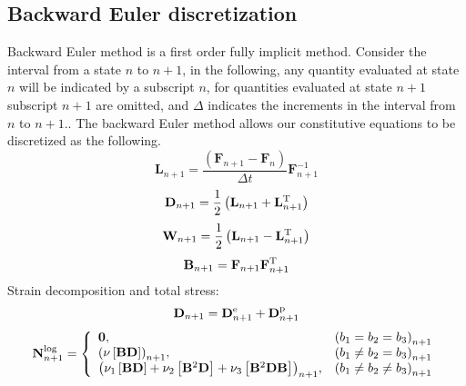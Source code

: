 \subsection{Backward Euler discretization}
\noindent
Backward Euler method is a first order fully implicit method. Consider the interval from a state $n$ to $n+1$, in the following, any quantity evaluated at state $n$ will be indicated by a subscript $n$, for quantities evaluated at state $n+1$ subscript $n+1$ are omitted, and $\Delta$ indicates the increments in the interval from $n$ to $n+1$.. The backward Euler method allows our constitutive equations to be discretized as the following.
\begin{equation}
{{\mathbf{L}}_{n + 1}} = \frac{{\left( {{{\mathbf{F}}_{n + 1}} - {{\mathbf{F}}_n}} \right)}}{{\Delta t}}{\mathbf{F}}_{n + 1}^{ - 1}
\end{equation}
\begin{equation}
{{\mathbf{D}}_{n + 1}} = \frac{1}{2}\left( {{{\mathbf{L}}_{n + 1}} + {\mathbf{L}}_{n + 1}^{\rm{T}}} \right)
\end{equation}
\begin{equation}
{{\mathbf{W}}_{n + 1}} = \frac{1}{2}\left( {{{\mathbf{L}}_{n + 1}} - {\mathbf{L}}_{n + 1}^{\rm{T}}} \right)
\end{equation}
\begin{equation}
{{\mathbf{B}}_{n + 1}} = {{\mathbf{F}}_{n + 1}}{\mathbf{F}}_{n + 1}^{\rm{T}}
\end{equation}
Strain decomposition and total stress:
\begin{equation}
{\mathbf{D}}_{n + 1} = {\mathbf{D}}^{\rm{e}}_{n + 1} + {\mathbf{D}}^{\rm{p}}_{n + 1}
\end{equation}
\begin{equation}
{\bf{N}}_{n + 1}^{\log } = \left\{ {\begin{array}{*{20}{l}}
{{\bf{0}},}&{{{\left( {{b_1} = {b_2} = {b_3}} \right)}_{n + 1}}}\\
{{{\left( {\nu \left[ {{\bf{BD}}} \right]} \right)}_{n + 1}},}&{{{\left( {{b_1} \ne {b_2} = {b_3}} \right)}_{n + 1}}}\\
{{{\left( {{\nu _1}\left[ {{\bf{BD}}} \right] + {\nu _2}\left[ {{{\bf{B}}^2}{\bf{D}}} \right] + {\nu _3}\left[ {{{\bf{B}}^2}{\bf{DB}}} \right]} \right)}_{n + 1}},}&{{{\left( {{b_1} \ne {b_2} \ne {b_3}} \right)}_{n + 1}}}
\end{array}} \right.
\end{equation}
